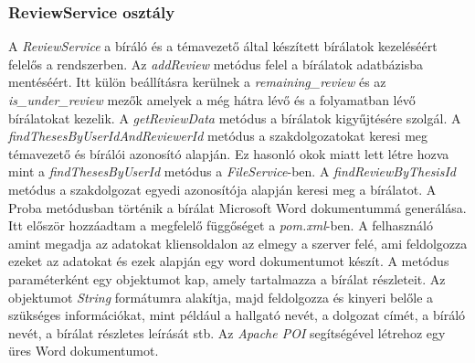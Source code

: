 \subsubsection{ReviewService osztály}

A \textit{ReviewService} a bíráló és a témavezető által készített bírálatok kezeléséért felelős a rendszerben. Az \textit{addReview} metódus felel a bírálatok adatbázisba mentéséért. Itt külön beállításra kerülnek a \textit{remaining\_review} és az \textit{is\_under\_review} mezők amelyek a még hátra lévő és a folyamatban lévő bírálatokat kezelik. A \textit{getReviewData} metódus a bírálatok kigyűjtésére szolgál. A \textit{findThesesByUserIdAndReviewerId} metódus a szakdolgozatokat keresi meg témavezető és bírálói azonosító alapján. Ez hasonló okok miatt lett létre hozva mint a \textit{findThesesByUserId} metódus a \textit{FileService}-ben. A \textit{findReviewByThesisId} metódus a szakdolgozat egyedi azonosítója alapján keresi meg a bírálatot. A Proba metódusban történik a bírálat Microsoft Word dokumentummá generálása. Itt először hozzáadtam a megfelelő függőséget a \textit{pom.xml}-ben. A felhasználó amint megadja az adatokat kliensoldalon az elmegy a szerver felé, ami feldolgozza ezeket az adatokat és ezek alapján egy word dokumentumot készít. A metódus paraméterként egy objektumot kap, amely tartalmazza a bírálat részleteit. Az objektumot \textit{String} formátumra alakítja, majd feldolgozza és kinyeri belőle a szükséges információkat, mint például a hallgató nevét, a dolgozat címét, a bíráló nevét, a bírálat részletes leírását stb. Az \textit{Apache POI} \cite{Apache POI} segítségével létrehoz egy üres Word dokumentumot.
